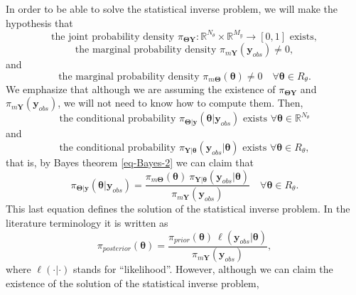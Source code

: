 In order to be able to solve the statistical inverse problem, we will make the hypothesis that
\begin{equation}\label{eq-hyp-jpd}
\mbox{the joint probability density }\pi_{\boldsymbol{\Theta}\mathbf{Y}}:\mathbb{R}^{N_{\theta}}\times\mathbb{R}^{M_y}\rightarrow [0,1]\mbox{ exists},
\end{equation}
\begin{equation}\label{eq-hyp-obs-mp}
\mbox{the marginal probability density }\pi_{m\mathbf{Y}}(\mathbf{y}_{obs})\neq 0,
\end{equation}
and
\begin{equation}\label{eq-hyp-theta-mp}
\mbox{the marginal probability density }\pi_{m\boldsymbol{\Theta}}(\boldsymbol{\theta})\neq 0\quad\forall\boldsymbol\theta\in R_{\theta}.
\end{equation}
We emphasize that although we are assuming the existence of
$\pi_{\boldsymbol{\Theta}\mathbf{Y}}$ and
$\pi_{m\mathbf{Y}}(\mathbf{y}_{obs})$,
we will not need to know how to compute them.
Then,
\begin{equation*}
\mbox{the conditional probability }\pi_{\boldsymbol\Theta|\mathbf{y}}(\boldsymbol\theta|\mathbf{y}_{obs})\mbox{ exists }\forall\boldsymbol\theta\in\mathbb{R}^{N_\theta}
\end{equation*}
and
\begin{equation*}
\mbox{the conditional probability }\pi_{\mathbf{Y}|\boldsymbol\theta}(\mathbf{y}_{obs}|\boldsymbol\theta)\mbox{ exists }\forall\boldsymbol\theta\in R_{\theta},
\end{equation*}
that is, by Bayes theorem \eqref{eq-Bayes-2} we can claim that
\begin{equation*}
\pi_{\boldsymbol\Theta|\mathbf{y}}(\boldsymbol\theta|\mathbf{y}_{obs})
=
\frac
{\pi_{m\boldsymbol{\Theta}}(\boldsymbol{\theta})~\pi_{\mathbf{Y}|\boldsymbol\theta}(\mathbf{y}_{obs}|\boldsymbol\theta)}
{\pi_{m\mathbf{Y}}(\mathbf{y}_{obs})}
\quad\forall\boldsymbol\theta\in R_{\theta}.
\end{equation*}
This last equation defines the solution of the statistical inverse problem. In the literature terminology it is written as
\begin{equation}\label{eq-sol-sip}
\pi_{posterior}(\boldsymbol\theta)
=
\frac
{\pi_{prior}(\boldsymbol{\theta})~\ell(\mathbf{y}_{obs}|\boldsymbol\theta)}
{\pi_{m\mathbf{Y}}(\mathbf{y}_{obs})},
\end{equation}
where $\ell(\cdot|\cdot)$ stands for ``likelihood''.
However, although we can claim the existence of the solution of the statistical inverse problem,
